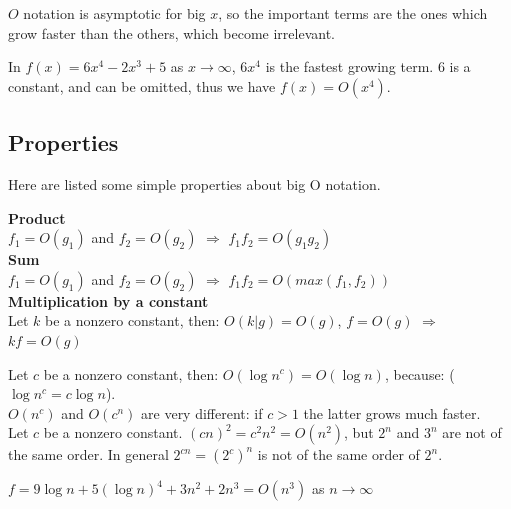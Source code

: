 \(O\) notation is asymptotic for big \(x\), so the important terms are the ones which grow faster than the others, which become irrelevant.

\begin{example}
In \(f(x) = 6x^{4} - 2x^{3} + 5\) as \(x \rightarrow \infty\), \(6x^{4}\) is the fastest growing term. \(6\) is a constant, and can be omitted, thus we have \(f(x)=O(x^{4})\).  
\end{example}

\subsection{Properties}
Here are listed some simple properties about big O notation.
\begin{definition}
\textbf{Product} \\
\(f_{1}=O(g_{1})\) and \(f_{2}=O(g_{2})\) \(\Rightarrow\) \(f_{1}f_{2}=O(g_{1}g_{2})\)
\\
\textbf{Sum} \\
\(f_{1}=O(g_{1})\) and \(f_{2}=O(g_{2})\) \(\Rightarrow\) \(f_{1}f_{2}=O(max(f_{1}, f_{2}))\)
\\
\textbf{Multiplication by a constant} \\
Let \(k\) be a nonzero constant, then: 
\(O(k|g)=O(g)\), \(f=O(g)\) \(\Rightarrow\)\(kf=O(g)\)
\end{definition}

\begin{definition}
Let \(c\) be a nonzero constant, then: \(O(\log n^{c}) = O(\log n)\), because: (\(\log n^{c} = c \log n\)).
\\
\(O(n^{c})\) and \(O(c^{n})\) are very different: if \(c>1\) the latter grows much faster.
\\
Let \(c\) be a nonzero constant. \((cn)^{2}=c^{2}n^{2} = O(n^{2})\), but \(2^{n}\) and \(3^{n}\) are not of the same order. In general \(2^{cn}=(2^{c})^{n}\) is not of the same order of \(2^{n}\).
\end{definition}

\begin{example}
\(f = 9 \log n + 5(\log n)^{4} + 3n^{2} + 2n^{3} = O(n^{3})\) as \(n \rightarrow \infty\)
\end{example}

